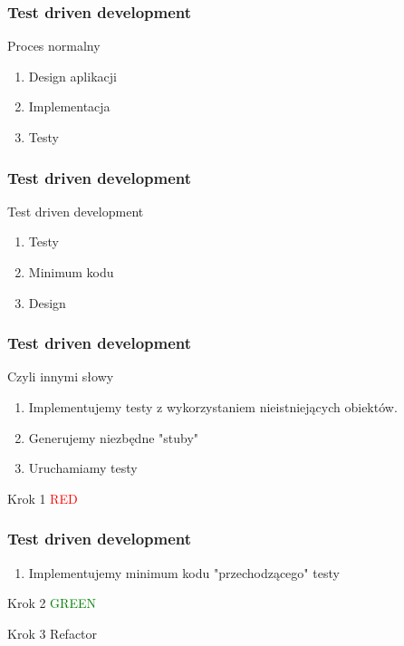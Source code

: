 \documentclass[slidestop,compress,mathserif]{beamer}
\begin{document}

\begin{frame}
\frametitle{Test driven development}
Proces normalny
 \begin{enumerate}
  \item Design aplikacji
  \pause \item Implementacja
  \pause \item Testy 
\end{enumerate}
\end{frame}

\begin{frame}
\frametitle{Test driven development}
Test driven development
 \begin{enumerate}
  \item Testy
  \pause \item Minimum kodu
  \pause \item Design %
\end{enumerate}
\end{frame}

\begin{frame}
\frametitle{Test driven development}
Czyli innymi słowy
 \begin{enumerate}
\item Implementujemy testy z wykorzystaniem nieistniejących obiektów.
\pause \item Generujemy niezbędne "stuby"
\pause \item Uruchamiamy testy
\end{enumerate}
\pause
\begin{block}{Krok 1}
	\textcolor{red}{RED}
\end{block}
\end{frame}

\begin{frame}
\frametitle{Test driven development}
 \begin{enumerate}
\item Implementujemy minimum kodu "przechodzącego" testy
\end{enumerate}
\pause
\begin{block}{Krok 2}
	\textcolor{green}{GREEN}
\end{block}
\pause
\begin{block}{Krok 3}
 Refactor
\end{block}
\end{frame}
\end{document}
